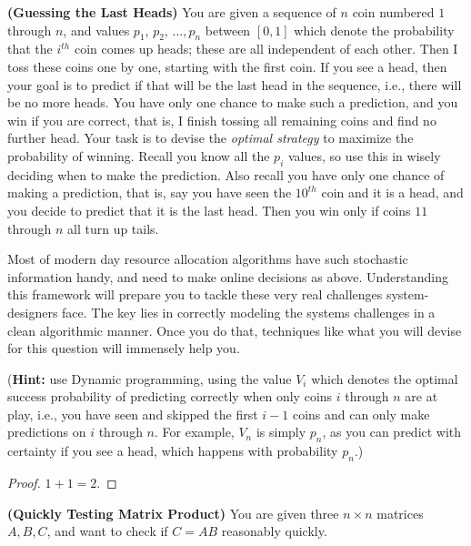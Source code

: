 \documentclass[solution,addpoints,12pt]{exam}
\begin{document}
\begin{questions}
\begin{parts}
\end{parts}


\question[20]  \textbf{(Guessing the Last Heads)}
You are given a sequence of $n$ coin numbered $1$ through $n$, and values $p_1$, $p_2$, $\ldots, p_n$ between $[0,1]$ which denote the probability that the $i^{th}$ coin comes up heads; these are all independent of each other. Then I toss these coins one by one, starting with the first coin. If you see a head, then your goal is to predict if that will be the last head in the sequence, i.e., there will be no more heads. You have only one chance to make such a prediction, and you win if you are correct, that is, I finish tossing all remaining coins and find no further head. Your task is to devise the \emph{optimal strategy} to maximize the probability of winning. Recall you know all the $p_i$ values, so use this in wisely deciding when to make the prediction. Also recall you have only one chance of making a prediction, that is, say you have seen the $10^{th}$ coin and it is a head, and you decide to predict that it is the last head. Then you win only if coins $11$ through $n$ all turn up tails.

Most of modern day resource allocation algorithms have such stochastic information handy, and need to make online decisions as above. Understanding this framework will prepare you to tackle these very real challenges system-designers face. The key lies in correctly modeling the systems challenges in a clean algorithmic manner. Once you do that, techniques like what you will devise for this question will immensely help you.

({\bf Hint:} use Dynamic programming, using the value $V_i$ which denotes the optimal success probability of predicting correctly when only coins $i$ through $n$ are at play, i.e., you have seen and skipped the first $i-1$ coins and can only make predictions on $i$ through $n$. For example, $V_n$ is simply $p_n$, as you can predict with certainty if you see a head, which happens with probability $p_n$.)

  \begin{solution}
  \begin{proof}
  $1 + 1 = 2$.
  \end{proof}
  \end{solution}


\question[15] \textbf{(Quickly Testing Matrix Product)}
You are given three $n \times n$ matrices $A, B, C$, and want to check if $C = AB$ reasonably quickly.

\begin{parts}

\end{parts}
\end{questions}
\end{document}
